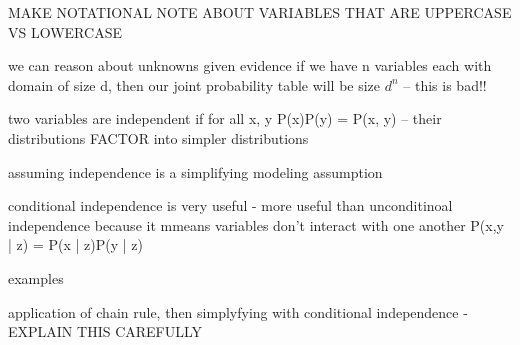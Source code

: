 MAKE NOTATIONAL NOTE ABOUT VARIABLES THAT ARE UPPERCASE VS LOWERCASE


we can reason about unknowns given evidence
if we have n variables each with domain of size d, then our joint probability table will be size $d^n$ -- this is bad!!

two variables are independent if for all x, y P(x)P(y) = P(x, y) -- their distributions FACTOR into simpler distributions

assuming independence is a simplifying modeling assumption

conditional independence is very useful - more useful than unconditinoal independence because it mmeans variables don't interact with one another
P(x,y | z) = P(x | z)P(y | z)

examples

application of chain rule, then simplyfying with conditional independence - EXPLAIN THIS CAREFULLY
